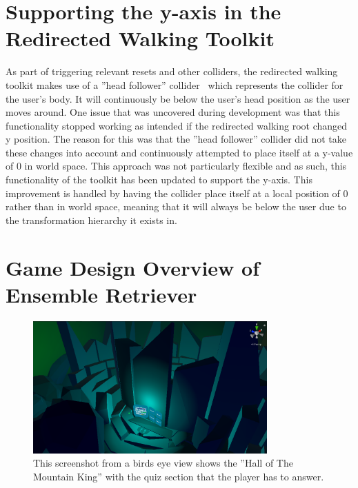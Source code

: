 \section{Supporting the y-axis in the Redirected Walking Toolkit}
As part of triggering relevant resets and other colliders, the redirected walking toolkit makes use of a ''head follower'' collider~\cite{headFollower} which represents the collider for the user's body. It will continuously be below the user's head position as the user moves around. One issue that was uncovered during development was that this functionality stopped working as intended if the redirected walking root changed y position. The reason for this was that the ''head follower'' collider did not take these changes into account and continuously attempted to place itself at a y-value of 0 in world space. This approach was not particularly flexible and as such, this functionality of the toolkit has been updated to support the y-axis. This improvement is handled by having the collider place itself at a local position of 0 rather than in world space, meaning that it will always be below the user due to the transformation hierarchy it exists in. 

\section{Game Design Overview of Ensemble Retriever} 
\begin{figure}[tbph]
    \centering
    \includegraphics[width=0.8\textwidth]{figures/screenshots/HallOfTheMountainKingKindaLowRes.png}
    \caption[Screenshot of the ''Hall of The Mountain King'']{This screenshot from a birds eye view shows the ''Hall of The Mountain King'' with the quiz section that the player has to answer.}
    \label{fig:mkhallWithWall}
\end{figure}

